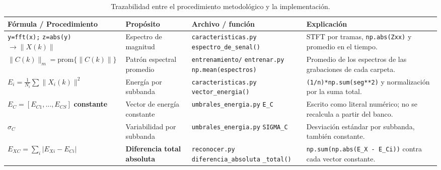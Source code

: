 \documentclass[conference]{IEEEtran}
\begin{document}
\begin{table}[!t]
\caption{Trazabilidad entre el procedimiento metodológico y la implementación.}
\label{tab:traza}
\centering
\renewcommand{\arraystretch}{1.4}
\footnotesize
\setlength{\tabcolsep}{5pt}
\begin{tabularx}{\textwidth}{@{}
  >{\raggedright\arraybackslash}p{2.8cm}
  >{\raggedright\arraybackslash}p{2.4cm}
  >{\raggedright\arraybackslash}p{3.6cm}
  >{\raggedright\arraybackslash}X
@{}}
\toprule
\textbf{Fórmula / Procedimiento} & \textbf{Propósito} &
\textbf{Archivo / función} & \textbf{Explicación} \\
\midrule

\texttt{y=fft(x);} \newline
\texttt{z=abs(y)} \newline
$\rightarrow \lVert X(k)\rVert$ &
Espectro de magnitud &
\texttt{caracteristicas.py}\newline
\texttt{espectro\_de\_senal()} &
STFT por tramas, \texttt{np.abs(Zxx)} y promedio en el tiempo. \\

$\lVert C(k)\rVert_m=\text{prom}\{\lVert C(k)\rVert\}$ &
Patrón espectral promedio &
\texttt{entrenamiento/}\newline
\texttt{entrenar.py}\newline
\texttt{np.mean(espectros)} &
Promedio de los espectros de las grabaciones de cada carpeta. \\

$E_{i}=\frac{1}{N_i}\sum\lVert X_i(k)\rVert^2$ &
Energía por subbanda &
\texttt{caracteristicas.py}\newline
\texttt{vector\_energia()} &
\texttt{(1/n)*np.sum(seg**2)} y normalización por la suma total. \\

$E_C=[E_{C1},\dots,E_{CS}]$ \textbf{constante} &
Vector de energía constante &
\texttt{umbrales\_energia.py}\newline
\texttt{E\_C} &
Escrito como literal numérico; no se recalcula a partir del banco. \\

$\sigma_C$ &
Variabilidad por subbanda &
\texttt{umbrales\_energia.py}\newline
\texttt{SIGMA\_C} &
Desviación estándar por subbanda, también constante. \\

$E_{XC}=\sum_i\lvert E_{Xi}-E_{Ci}\rvert$ &
\textbf{Diferencia total absoluta} &
\texttt{reconocer.py}\newline
\texttt{diferencia\_absoluta}\newline
\texttt{\_total()} &
\texttt{np.sum(np.abs(E\_X\,-\,E\_Ci))} contra cada vector constante. \\


\end{tabularx}
\end{table}
\end{document}

